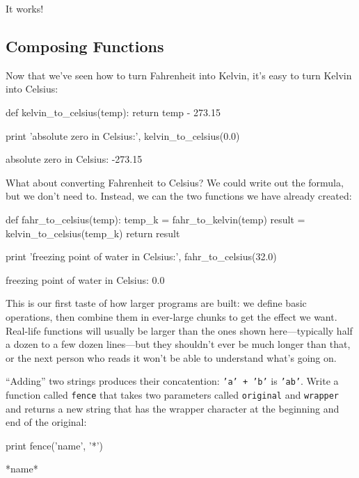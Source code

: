 It works!

\subsection{Composing Functions}

Now that we've seen how to turn Fahrenheit into Kelvin, it's easy to
turn Kelvin into Celsius:

\begin{VerbIn}
def kelvin_to_celsius(temp):
    return temp - 273.15

print 'absolute zero in Celsius:', kelvin_to_celsius(0.0)
\end{VerbIn}

\begin{VerbOut}
absolute zero in Celsius: -273.15
\end{VerbOut}

What about converting Fahrenheit to Celsius? We could write out the
formula, but we don't need to. Instead, we can
 the two functions we have
already created:

\begin{VerbIn}
def fahr_to_celsius(temp):
    temp_k = fahr_to_kelvin(temp)
    result = kelvin_to_celsius(temp_k)
    return result

print 'freezing point of water in Celsius:', fahr_to_celsius(32.0)
\end{VerbIn}

\begin{VerbOut}
freezing point of water in Celsius: 0.0
\end{VerbOut}

This is our first taste of how larger programs are built: we define
basic operations, then combine them in ever-large chunks to get the
effect we want. Real-life functions will usually be larger than the ones
shown here---typically half a dozen to a few dozen lines---but they
shouldn't ever be much longer than that, or the next person who reads it
won't be able to understand what's going on.

\begin{challenge}
  ``Adding'' two strings produces their concatention: \texttt{'a' + 'b'}
  is \texttt{'ab'}. Write a function called \texttt{fence} that takes
  two parameters called \texttt{original} and \texttt{wrapper} and
  returns a new string that has the wrapper character at the beginning
  and end of the original:

\begin{VerbIn}
print fence('name', '*')
\end{VerbIn}

\begin{VerbOut}
*name*
\end{VerbOut}
\end{challenge}


